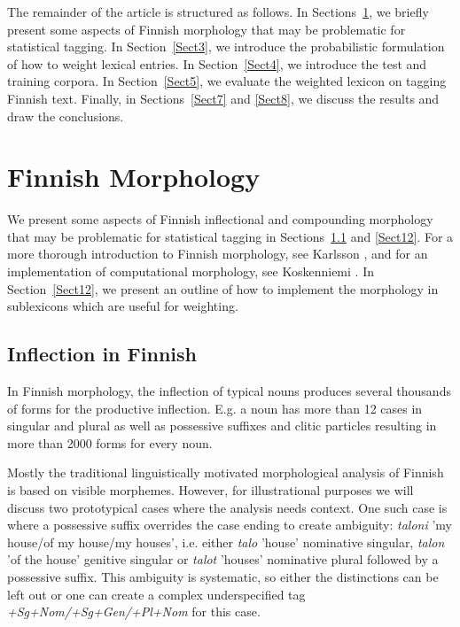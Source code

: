 \documentclass[a4paper]{article}
\begin{document}
The remainder of the article is structured as follows. In
Sections~\ref{Sect1}, we briefly present some aspects of Finnish
morphology that may be problematic for statistical tagging. In
Section~\ref{Sect3}, we introduce the probabilistic formulation of how
to weight lexical entries. In Section~\ref{Sect4}, we introduce the
test and training corpora. In Section~\ref{Sect5}, we evaluate the
weighted lexicon on tagging Finnish text. Finally, in
Sections~\ref{Sect7} and \ref{Sect8}, we discuss the results and draw
the conclusions.

\section{Finnish Morphology}
\label{Sect1}

We present some aspects of Finnish inflectional and compounding
morphology that may be problematic for statistical tagging in
Sections~\ref{Sect11} and \ref{Sect12}. For a more thorough
introduction to Finnish morphology, see Karlsson \cite{karlsson1999},
and for an implementation of computational morphology, see Koskenniemi
\cite{koskenniemi1983}. In Section~\ref{Sect12}, we present an outline
of how to implement the morphology in sublexicons which are useful for
weighting.
 
\subsection{Inflection in Finnish}
\label{Sect11}

In Finnish morphology, the inflection of typical nouns produces
several thousands of forms for the productive inflection. E.g. a noun
has more than 12 cases in singular and plural as well as possessive
suffixes and clitic particles resulting in more than 2000 forms for
every noun. 

Mostly the traditional linguistically motivated morphological analysis
of Finn\-ish is based on visible morphemes. However, for illustrational
purposes we will discuss two prototypical cases where the analysis
needs context. One such case is where a possessive suffix overrides
the case ending to create ambiguity: {\em taloni} 'my house/of my
house/my houses', i.e. either {\em talo} 'house' nominative singular,
{\em talon} 'of the house' genitive singular or {\em talot} 'houses'
nominative plural followed by a possessive suffix. This ambiguity is
systematic, so either the distinctions can be left out or one can
create a complex underspecified tag {\em +Sg+Nom/\-+Sg+Gen/\-+Pl+Nom} for
this case.
\end{document}
